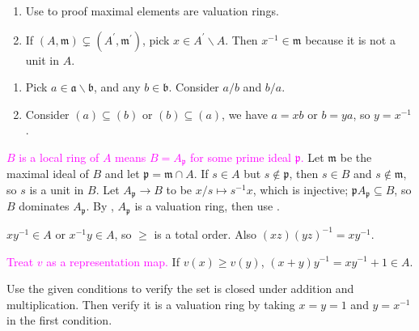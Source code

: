 \begin{exercise}\label{ex5.27}
	\begin{enumerate}
		\item[$\Rightarrow$:] Use  to proof maximal elements are valuation rings.
		\item[$\Leftarrow$:] If $(A,\mathfrak{m})\subsetneq(A^\prime,\mathfrak{m}^\prime)$, pick $x\in A^\prime\backslash A$. Then $x^{-1}\in\mathfrak{m}$ because it is not a unit in $A$.
	\end{enumerate}
\end{exercise}

\begin{exercise}\label{ex5.28}
	\begin{enumerate}
		\item[(1) $\Rightarrow$ (2)] Pick $a\in\mathfrak{a}\backslash\mathfrak{b}$, and any $b\in\mathfrak{b}$. Consider $a/b$ and $b/a$.
		\item[(2) $\Rightarrow$ (1)] Consider $(a)\subseteq(b)$ or $(b)\subseteq(a)$, we have $a=xb$ or $b=ya$, so $y=x^{-1}$.
	\end{enumerate}
\end{exercise}

\begin{exercise}\label{ex5.29}
	\textcolor{magenta}{$B$ is a local ring of $A$ means $B=A_\mathfrak{p}$ for some prime ideal $\mathfrak{p}$.} Let $\mathfrak{m}$ be the maximal ideal of $B$ and let $\mathfrak{p}=\mathfrak{m}\cap A$. If $s\in A$ but $s\notin\mathfrak{p}$, then $s\in B$ and $s\notin\mathfrak{m}$, so $s$ is a unit in $B$. Let $A_\mathfrak{p}\rightarrow B$ to be $x/s\mapsto s^{-1}x$, which is injective; $\mathfrak{p}A_\mathfrak{p}\subseteq B$, so $B$ dominates $A_\mathfrak{p}$. By , $A_\mathfrak{p}$ is a valuation ring, then use .
\end{exercise}

\begin{exercise}\label{ex5.30}
	$xy^{-1}\in A$ or $x^{-1}y\in A$, so $\geqslant$ is a total order. Also $(xz)(yz)^{-1}=xy^{-1}$.
	
	\textcolor{magenta}{Treat $v$ as a representation map.} If $v(x)\geqslant v(y)$, $(x+y)y^{-1}=xy^{-1}+1\in A$.
\end{exercise}

\begin{exercise}\label{ex5.31}
	Use the given conditions to verify the set is closed under addition and multiplication. Then verify it is a valuation ring by taking $x=y=1$ and $y=x^{-1}$ in the first condition.
\end{exercise}

\begin{exercise}\label{ex5.32}
	
\end{exercise}

\begin{exercise}\label{ex5.33}
	
\end{exercise}

\begin{exercise}\label{ex5.34}
	
\end{exercise}

\begin{exercise}\label{ex5.35}
	
\end{exercise}
